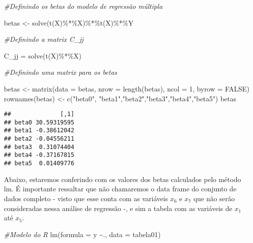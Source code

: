\documentclass[
]{article}
\newenvironment{Shaded}{\begin{snugshade}}{\end{snugshade}}
\newcommand{\AttributeTok}[1]{\textcolor[rgb]{0.77,0.63,0.00}{#1}}
\newcommand{\CommentTok}[1]{\textcolor[rgb]{0.56,0.35,0.01}{\textit{#1}}}
\newcommand{\ConstantTok}[1]{\textcolor[rgb]{0.00,0.00,0.00}{#1}}
\newcommand{\DecValTok}[1]{\textcolor[rgb]{0.00,0.00,0.81}{#1}}
\newcommand{\FunctionTok}[1]{\textcolor[rgb]{0.00,0.00,0.00}{#1}}
\newcommand{\NormalTok}[1]{#1}
\newcommand{\OtherTok}[1]{\textcolor[rgb]{0.56,0.35,0.01}{#1}}
\newcommand{\SpecialCharTok}[1]{\textcolor[rgb]{0.00,0.00,0.00}{#1}}
\newcommand{\StringTok}[1]{\textcolor[rgb]{0.31,0.60,0.02}{#1}}
\begin{document}
\begin{Shaded}
\begin{Highlighting}[]
\CommentTok{\#Definindo os betas do modelo de regressão múltipla}

\NormalTok{betas }\OtherTok{\textless{}{-}} \FunctionTok{solve}\NormalTok{(}\FunctionTok{t}\NormalTok{(X)}\SpecialCharTok{\%*\%}\NormalTok{X)}\SpecialCharTok{\%*\%}\FunctionTok{t}\NormalTok{(X)}\SpecialCharTok{\%*\%}\NormalTok{Y}

\CommentTok{\#Definindo a matrix C\_jj}

\NormalTok{C\_jj }\OtherTok{=} \FunctionTok{solve}\NormalTok{(}\FunctionTok{t}\NormalTok{(X)}\SpecialCharTok{\%*\%}\NormalTok{X)}

\CommentTok{\#Definindo uma matrix para os betas}

\NormalTok{betas }\OtherTok{\textless{}{-}} \FunctionTok{matrix}\NormalTok{(}\AttributeTok{data =}\NormalTok{ betas, }\AttributeTok{nrow =} \FunctionTok{length}\NormalTok{(betas), }\AttributeTok{ncol =} \DecValTok{1}\NormalTok{, }\AttributeTok{byrow =} \ConstantTok{FALSE}\NormalTok{)}
\FunctionTok{rownames}\NormalTok{(betas) }\OtherTok{\textless{}{-}} \FunctionTok{c}\NormalTok{(}\StringTok{"beta0"}\NormalTok{, }\StringTok{"beta1"}\NormalTok{,}\StringTok{"beta2"}\NormalTok{,}\StringTok{"beta3"}\NormalTok{,}\StringTok{"beta4"}\NormalTok{,}\StringTok{"beta5"}\NormalTok{)}
\NormalTok{betas}
\end{Highlighting}
\end{Shaded}

\begin{verbatim}
##              [,1]
## beta0 30.59319595
## beta1 -0.38612042
## beta2 -0.04556211
## beta3  0.31074404
## beta4 -0.37167815
## beta5  0.01409776
\end{verbatim}

Abaixo, estaremos conferindo com os valores dos betas calculados pelo
método lm. É importante ressaltar que não chamaremos o data frame do
conjunto de dados completo - visto que esse conta com as variáveis
\(x_6\) e \(x_7\) que não serão consideradas nessa análise de regressão
-, e sim a tabela com as variáveis de \(x_1\) até \(x_5\).

\begin{Shaded}
\begin{Highlighting}[]
\CommentTok{\#Modelo do R}
\FunctionTok{lm}\NormalTok{(}\AttributeTok{formula =}\NormalTok{ y }\SpecialCharTok{\textasciitilde{}}\NormalTok{., }\AttributeTok{data =}\NormalTok{ tabela01)}
\end{Highlighting}
\end{Shaded}
\end{document}
